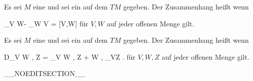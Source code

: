 {}
{

Es sei $M$ eine
und sei ein
auf dem
$TM$ gegeben. Der Zusammenhang heißt
wenn

\mavergleichskettedisp
{\vergleichskette
{ \nabla_V W- \nabla_W V
}
{ =} { [V,W]
}
{ } {
}
{ } {
}
{ } {
}
}
{}{}{}
für
$V,W$ auf jeder offenen Menge gilt.

}

{}
{

Es sei $M$ eine
und sei ein
auf dem
$TM$ gegeben. Der Zusammenhang heißt
wenn

\mavergleichskettedisp
{\vergleichskette
{ D_V \left\langle  W  ,  Z  \right\rangle
}
{ =} { \left\langle \nabla_V W , Z  \right\rangle  + \left\langle  W  ,  \nabla_VZ  \right\rangle
}
{ } {
}
{ } {
}
{ } {
}
}
{}{}{.}
für
$V,W ,Z$ auf jeder offenen Menge gilt.

}

__NOEDITSECTION__

